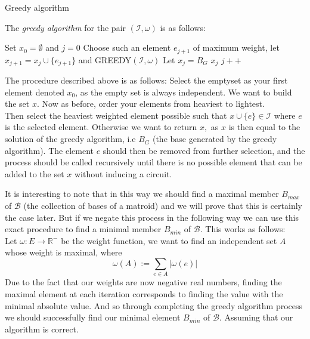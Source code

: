 \documentclass[../main.tex]{subfiles}
\begin{document}
\begin{algorithm}[H]
\caption{Greedy algorithm}\label{matroid_ver}
The \textit{greedy algorithm} for the pair $(\mathcal{I}, \omega)$ is as follows:
\begin{algorithmic}[1]
\State Set $x_0 = \emptyset$ and $j=0$
\State Choose such an element $e_{j+1}$ of maximum weight,
\State let $x_{j+1} = x_j \cup \{e_{j+1}\}$ and
\State GREEDY$(\mathcal{I}, \omega)$
\Else 
\State Let $x_j = B_G$
\State\Return $x_j$
\EndIf
\State $j++$
\EndProcedure
\end{algorithmic}
\end{algorithm}

The procedure described above is as follows: Select the emptyset as your first element denoted $x_0$, as the empty set is always independent. We want to build the set $x.$ Now as before, order your elements from heaviest to lightest.\\
Then select the heaviest weighted element possible such that $x \cup \{e\} \in \mathcal{I}$ where $e$ is the selected element. Otherwise we want to return $x,$ as $x$ is then equal to the solution of the greedy algorithm, i.e $B_G$ (the base generated by the greedy algorithm). The element $e$ should then be removed from further selection, and the process should be called recursively until there is no possible element that can be added to the set $x$ without inducing a circuit.

\begin{rem}
It is interesting to note that in this way we should find a maximal member $B_{max}$ of $\mathcal{B}$ (the collection of bases of a matroid) and we will prove that this is certainly the case later. But if we negate this process in the following way we can use this exact procedure to find a minimal member $B_{min}$ of $\mathcal{B}.$ This works as follows:\\
Let $\omega : E \longrightarrow \mathbb{R^{-}}$ be the weight function, we want to find an independent set $A$ whose weight is maximal, where
\begin{equation}
\omega(A) := \sum_{e \in A} |\omega (e)|
\end{equation}
Due to the fact that our weights are now negative real numbers, finding the maximal element at each iteration corresponds to finding the value with the minimal absolute value. And so through completing the greedy algorithm process we should successfully find our minimal element $B_{min}$ of $\mathcal{B}.$ Assuming that our algorithm is correct.
\end{rem}
\end{document}
